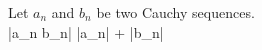 \documentclass[preview]{standalone}
\begin{document}
\begin{center}
Let $a_n$ and $b_n$ be two Cauchy sequences.\\|a_n \cdot b_n| \leq |a_n| + |b_n|
\end{center}
\end{document}
